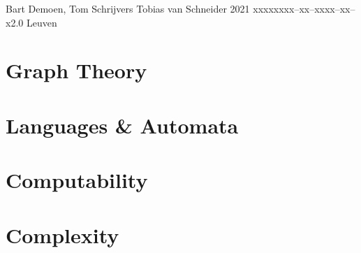 \documentclass{tstextbook}
\begin{document}
       {Bart Demoen, Tom Schrijvers}
       {Tobias van Schneider}
       {2021}
       {xxxxx}{xxx--xx--xxxx--xx--x}{2.0}
       {}
       {Leuven}





\part{Graph Theory}

\graphicspath{{./GraphTheory/figures/}}



\part{Languages \& Automata}

\graphicspath{{./LanguagesAutomata/figures/}}



\part{Computability}

\graphicspath{{./Computability/figures/}}



\part{Complexity}

\graphicspath{{./Complexity/figures/}}


\end{document}
